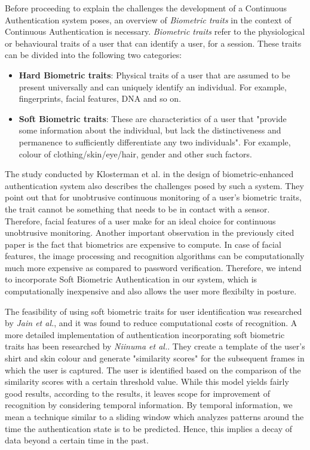 \documentclass[%
        final,
        internal,
        notitlepage,
        narroweqnarray,
        inline,
        ]{ieee}
\begin{document}
Before proceeding to explain the challenges the development of a Continuous Authentication system poses, an overview of \emph{Biometric traits} in the context of Continuous Authentication is necessary.
\emph{Biometric traits} refer to the physiological or behavioural traits of a user that can identify a user, for a session.
These traits can be divided into the following two categories:
\begin{itemize}
	\item {\bf Hard Biometric traits}: Physical traits of a user that are assumed to be present universally and can uniquely identify an individual. For example, fingerprints, facial features, DNA and so on.
	\item {\bf Soft Biometric traits}: These are characteristics of a user that "provide some information about the individual, but lack the distinctiveness and permanence to sufficiently differentiate any two individuals"\cite{Jain204}. For example, colour of clothing/skin/eye/hair, gender and other such factors.

\end{itemize}

The study conducted by Klosterman et al.\cite{Klos00} in the design of biometric-enhanced authentication system also describes the challenges posed by such a system.
They point out that for unobtrusive continuous monitoring of a user's biometric traits, the trait cannot be something that needs to be in contact with a sensor.
Therefore, facial features of a user make for an ideal choice for continuous unobtrusive monitoring.
Another important observation in the previously cited paper is the fact that biometrics are expensive to compute.
In case of facial features, the image processing and recognition algorithms can be computationally much more expensive as compared to password verification.
Therefore, we intend to incorporate Soft Biometric Authentication in our system, which is computationally inexpensive and also allows the user more flexibilty in posture. 

The feasibility of using soft biometric traits for user identification was researched by \emph{Jain et al.}\cite{Jain204}, and it was found to reduce computational costs of recognition.
A more detailed implementation of authentication incorporating soft biometric traits has been researched by \emph{Niinuma et al.}\cite{Niin10}.
They create a template of the user's shirt and skin colour and generate "similarity scores" for the subsequent frames in which the user is captured.
The user is identified based on the comparison of the similarity scores with a certain threshold value.
While this model yields fairly good results, according to the results, it leaves scope for improvement of recognition by considering temporal information.
By temporal information, we mean a technique similar to a sliding window which analyzes patterns around the time the authentication state is to be predicted.
Hence, this implies a decay of data beyond a certain time in the past.
\end{document}
